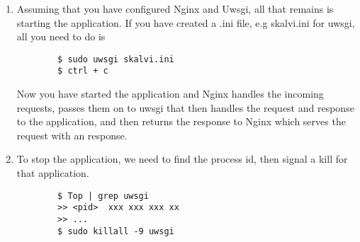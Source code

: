 \begin{enumerate}
    
    \item Assuming that you have configured Nginx and Uwsgi, all that remains is starting the application. 
    If you have created a .ini file, e.g skalvi.ini for uwsgi, all you need to do is 
    \begin{lstlisting}
        $ sudo uwsgi skalvi.ini
        $ ctrl + c
    \end{lstlisting}
    
    Now you have started the application and Nginx handles the incoming requests, passes them on to uwsgi that then handles the request and response to the application, and then returns the response to Nginx which serves the request with an response.
    
    \item To stop the application, we need to find the process id, then signal a kill for that application.
    \begin{lstlisting}
        $ Top | grep uwsgi
        >> <pid>  xxx xxx xxx xx
        >> ...
        $ sudo killall -9 uwsgi
    \end{lstlisting}
    
\end{enumerate}
    

\clearpage
